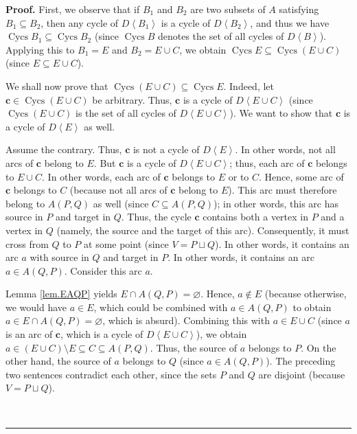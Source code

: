 \documentclass[numbers=enddot,12pt,final,onecolumn,notitlepage]{scrartcl}%
\theoremstyle{definition}
\newenvironment{proof}[1][Proof]{\noindent\textbf{#1.} }{\ \rule{0.5em}{0.5em}}
\theoremstyle{plainsl}
\begin{document}
\begin{proof}
First, we observe that if $B_{1}$ and $B_{2}$ are two subsets of $A$
satisfying $B_{1}\subseteq B_{2}$, then any cycle of $D\left\langle
B_{1}\right\rangle $ is a cycle of $D\left\langle B_{2}\right\rangle $, and
thus we have $\operatorname*{Cycs}B_{1}\subseteq\operatorname*{Cycs}B_{2}$
(since $\operatorname*{Cycs}B$ denotes the set of all cycles of $D\left\langle
B\right\rangle $). Applying this to $B_{1}=E$ and $B_{2}=E\cup C$, we obtain
$\operatorname*{Cycs}E\subseteq\operatorname*{Cycs}\left(  E\cup C\right)  $
(since $E\subseteq E\cup C$).

We shall now prove that $\operatorname*{Cycs}\left(  E\cup C\right)
\subseteq\operatorname*{Cycs}E$. Indeed, let $\mathbf{c}\in
\operatorname*{Cycs}\left(  E\cup C\right)  $ be arbitrary. Thus, $\mathbf{c}$
is a cycle of $D\left\langle E\cup C\right\rangle $ (since
$\operatorname*{Cycs}\left(  E\cup C\right)  $ is the set of all cycles of
$D\left\langle E\cup C\right\rangle $). We want to show that $\mathbf{c}$ is a
cycle of $D\left\langle E\right\rangle $ as well.

Assume the contrary. Thus, $\mathbf{c}$ is not a cycle of $D\left\langle
E\right\rangle $. In other words, not all arcs of $\mathbf{c}$ belong to $E$.
But $\mathbf{c}$ is a cycle of $D\left\langle E\cup C\right\rangle $; thus,
each arc of $\mathbf{c}$ belongs to $E\cup C$. In other words, each arc of
$\mathbf{c}$ belongs to $E$ or to $C$. Hence, some arc of $\mathbf{c}$ belongs
to $C$ (because not all arcs of $\mathbf{c}$ belong to $E$). This arc must
therefore belong to $A\left(  P,Q\right)  $ as well (since $C\subseteq
A\left(  P,Q\right)  $); in other words, this arc has source in $P$ and target
in $Q$. Thus, the cycle $\mathbf{c}$ contains both a vertex in $P$ and a
vertex in $Q$ (namely, the source and the target of this arc). Consequently,
it must cross from $Q$ to $P$ at some point (since $V=P\sqcup Q$). In other
words, it contains an arc $a$ with source in $Q$ and target in $P$. In other
words, it contains an arc $a\in A\left(  Q,P\right)  $. Consider this arc $a$.

Lemma \ref{lem.EAQP} yields $E\cap A\left(  Q,P\right)  =\varnothing$. Hence,
$a\notin E$ (because otherwise, we would have $a\in E$, which could be
combined with $a\in A\left(  Q,P\right)  $ to obtain $a\in E\cap A\left(
Q,P\right)  =\varnothing$, which is absurd). Combining this with $a\in E\cup
C$ (since $a$ is an arc of $\mathbf{c}$, which is a cycle of $D\left\langle
E\cup C\right\rangle $), we obtain $a\in\left(  E\cup C\right)  \setminus
E\subseteq C\subseteq A\left(  P,Q\right)  $. Thus, the source of $a$ belongs
to $P$. On the other hand, the source of $a$ belongs to $Q$ (since $a\in
A\left(  Q,P\right)  $). The preceding two sentences contradict each other,
since the sets $P$ and $Q$ are disjoint (because $V=P\sqcup Q$).


\end{proof}
\end{document}
